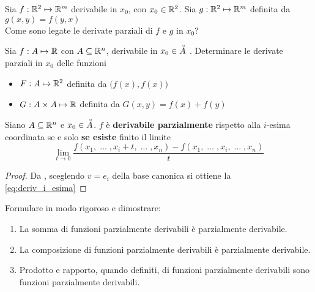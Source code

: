 \begin{exercise}
	Sia $f:\mathbb{R}^2 \mapsto \mathbb{R}^m$ derivabile in $x_0$, con $x_0 \in \mathbb{R}^2$. Sia $g:\mathbb{R}^2 \mapsto \mathbb{R}^m$ definita da $g(x,y) = f(y,x)$\\
	Come sono legate le derivate parziali di $f$ e $g$ in $x_0$?
\end{exercise}
\begin{exercise}
	Sia $f:A \mapsto \mathbb{R}$ con $A \subseteq \mathbb{R}^n$, derivabile in $x_0 \in \accentset{\circ}{A}$ . Determinare le derivate parziali in $x_0$ delle funzioni
	\begin{itemize}
		\item $F:A \mapsto \mathbb{R}^2$ definita da $\bigl( f(x), f(x) \bigr)$
		\item $G:A \times A \mapsto \mathbb{R}$ definita da $G(x,y) = f(x) + f(y)$
	\end{itemize}
\end{exercise}
\begin{proposition}
	Siano $A \subseteq \mathbb{R}^n$ e $x_0 \in \accentset{\circ}{A}$. $f$ è \textbf{derivabile parzialmente} rispetto alla $i$-esima coordinata se e solo \textbf{se esiste} finito il limite
	\begin{equation}
		\label{eq:deriv_i_esima}
		\lim\limits_{t \to 0} \frac{f(x_1,\;\dotsc\;,x_i+t,\;\dotsc\;,x_n) - f(x_1,\;\dotsc\;,x_i,\;\dotsc\;,x_n)}{t}
	\end{equation}
	\begin{proof}
		Da , sceglendo $v = e_i$ della base canonica si ottiene la \cref{eq:deriv_i_esima}
	\end{proof}
\end{proposition}
\begin{exercise}
	\label{ex:funz_derivabili}
	Formulare in modo rigoroso e dimostrare:
	\begin{enumerate}
		\item La somma di funzioni parzialmente derivabili è parzialmente derivabile.
		\item La composizione di funzioni parzialmente derivabili è parzialmente derivabile.
		\item Prodotto e rapporto, quando definiti, di funzioni parzialmente derivabili sono funzioni parzialmente derivabili.
	\end{enumerate}
\end{exercise}

